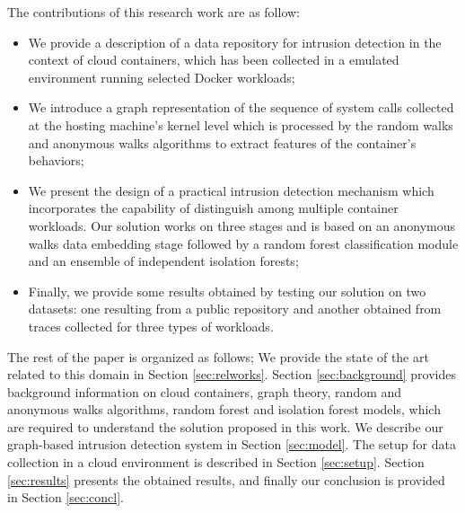 The contributions of this research work are as follow:
\begin{itemize}
  \item We provide a description of a data repository for intrusion detection in the context of cloud containers, which has been collected in a emulated environment running selected Docker workloads;
  \item We introduce a graph representation of the sequence of system calls collected at the hosting machine's kernel level which is processed by the random walks and anonymous walks algorithms to extract features of the container's behaviors;
  \item We present the design of a practical intrusion detection mechanism which incorporates the capability of distinguish among multiple container workloads. Our solution works on three stages and is based on an anonymous walks data embedding stage followed by a random forest classification module and an ensemble of independent isolation forests;
  \item Finally, we provide some results obtained by testing our solution on two datasets: one resulting from a public repository and another obtained from traces collected for three types of workloads.
\end{itemize}

The rest of the paper is organized as follows; We provide the state of the art related to this domain in Section \ref{sec:relworks}. Section \ref{sec:background} provides background information on cloud containers, graph theory, random and anonymous walks algorithms, random forest and isolation forest models, which are required to understand the solution proposed in this work. We describe our graph-based intrusion detection system in Section \ref{sec:model}. The setup for data collection in a cloud environment is described in Section \ref{sec:setup}. Section \ref{sec:results} presents the obtained results, and finally our conclusion is provided in Section \ref{sec:concl}.

